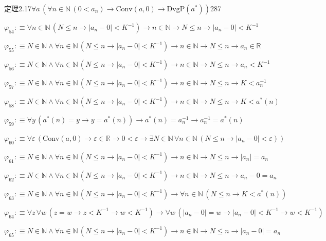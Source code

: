 \begin{fullproof}{定理2.17}{$\forall a\,(\forall n \in \mathbb{N}\,(0 < a_{n}) \to \mathrm{Conv}(a,0) \to \mathrm{DvgP}(a^{\ast}))$}{287}
\begin{abbrevlist}
\item $\varphi_{54} :\equiv \forall n \in \mathbb{N}\,(N \leq n \to \lvert a_{n} - 0 \rvert < K^{-1}) \to n \in \mathbb{N} \to N \leq n \to \lvert a_{n} - 0 \rvert < K^{-1}$
\item $\varphi_{55} :\equiv N \in \mathbb{N} \land \forall n \in \mathbb{N}\,(N \leq n \to \lvert a_{n} - 0 \rvert < K^{-1}) \to n \in \mathbb{N} \to N \leq n \to a_{n} \in \mathbb{R}$
\item $\varphi_{56} :\equiv N \in \mathbb{N} \land \forall n \in \mathbb{N}\,(N \leq n \to \lvert a_{n} - 0 \rvert < K^{-1}) \to n \in \mathbb{N} \to N \leq n \to a_{n} < K^{-1}$
\item $\varphi_{57} :\equiv N \in \mathbb{N} \land \forall n \in \mathbb{N}\,(N \leq n \to \lvert a_{n} - 0 \rvert < K^{-1}) \to n \in \mathbb{N} \to N \leq n \to K < a_{n}^{-1}$
\item $\varphi_{58} :\equiv N \in \mathbb{N} \land \forall n \in \mathbb{N}\,(N \leq n \to \lvert a_{n} - 0 \rvert < K^{-1}) \to n \in \mathbb{N} \to N \leq n \to K < a^{\ast}(n)$
\item $\varphi_{59} :\equiv \forall y\,(a^{\ast}(n) = y \to y = a^{\ast}(n)) \to a^{\ast}(n) = a_{n}^{-1} \to a_{n}^{-1} = a^{\ast}(n)$
\item $\varphi_{60} :\equiv \forall \varepsilon\,(\mathrm{Conv}(a,0) \to \varepsilon \in \mathbb{R} \to 0 < \varepsilon \to \exists N \in \mathbb{N}\,\forall n \in \mathbb{N}\,(N \leq n \to \lvert a_{n} - 0 \rvert < \varepsilon))$
\item $\varphi_{61} :\equiv N \in \mathbb{N} \land \forall n \in \mathbb{N}\,(N \leq n \to \lvert a_{n} - 0 \rvert < K^{-1}) \to n \in \mathbb{N} \to N \leq n \to \lvert a_{n} \rvert = a_{n}$
\item $\varphi_{62} :\equiv N \in \mathbb{N} \land \forall n \in \mathbb{N}\,(N \leq n \to \lvert a_{n} - 0 \rvert < K^{-1}) \to n \in \mathbb{N} \to N \leq n \to a_{n} - 0 = a_{n}$
\item $\varphi_{63} :\equiv N \in \mathbb{N} \land \forall n \in \mathbb{N}\,(N \leq n \to \lvert a_{n} - 0 \rvert < K^{-1}) \to \forall n \in \mathbb{N}\,(N \leq n \to K < a^{\ast}(n))$
\item $\varphi_{64} :\equiv \forall z\,\forall w\,(z = w \to z < K^{-1} \to w < K^{-1}) \to \forall w\,(\lvert a_{n} - 0 \rvert = w \to \lvert a_{n} - 0 \rvert < K^{-1} \to w < K^{-1})$
\item $\varphi_{65} :\equiv N \in \mathbb{N} \land \forall n \in \mathbb{N}\,(N \leq n \to \lvert a_{n} - 0 \rvert < K^{-1}) \to n \in \mathbb{N} \to N \leq n \to \lvert a_{n} - 0 \rvert = a_{n}$

\end{abbrevlist}
\end{fullproof}

